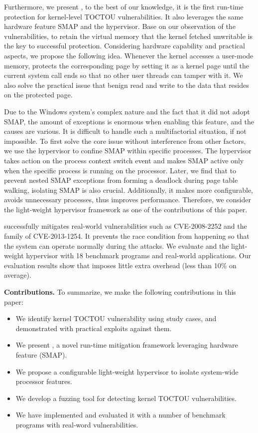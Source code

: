 Furthermore, we present \name, to the best of our knowledge, it is the first run-time protection for kernel-level TOCTOU vulnerabilities. It also leverages the same hardware feature SMAP and the hypervisor. Base on our observation of the vulnerabilities, to retain the virtual memory that the kernel fetched unwritable is the key to successful protection. Considering hardware capability and practical aspects, we propose the following idea. Whenever the kernel accesses a user-mode memory, \name protects the corresponding page by setting it as a kernel page until the current system call ends so that no other user threads can tamper with it. We also solve the practical issue that benign read and write to the data that resides on the protected page.


Due to the Windows system's complex nature and the fact that it did not adopt SMAP, the amount of exceptions is enormous when enabling this feature, and the causes are various. It is difficult to handle such a multifactorial situation, if not impossible. To first solve the core issue without interference from other factors, we use the hypervisor to confine SMAP within specific processes. The hypervisor takes action on the process context switch event and makes SMAP active only when the specific process is running on the processor. Later, we find that to prevent nested SMAP exceptions from forming a deadlock during page table walking, isolating SMAP is also crucial. Additionally, it makes \name more configurable, avoids unnecessary processes, thus improves performance. Therefore, we consider the light-weight hypervisor framework as one of the contributions of this paper.

\name successfully mitigates real-world vulnerabilities such as CVE-2008-2252 and the family of CVE-2013-1254. It prevents the race condition from happening so that the system can operate normally during the attacks. We evaluate \name and the light-weight hypervisor with 18 benchmark programs and real-world applications. Our evaluation results show that \name imposes little extra overhead (less than 10\% on average).

\textbf{Contributions.} To summarize, we make the following contributions in this paper:
\begin{itemize}[leftmargin=*]
    \item We identify kernel TOCTOU vulnerability using study cases, and demonstrated with practical exploits against them. 
    \item We present \name, a novel run-time mitigation framework leveraging hardware feature (SMAP). 
    \item We propose a configurable light-weight hypervisor to isolate system-wide processor features.
    \item We develop a fuzzing tool \toolname for detecting kernel TOCTOU vulnerabilities.
    \item We have implemented \name and evaluated it with a number of benchmark programs with real-word vulnerabilities.
  
\end{itemize}

